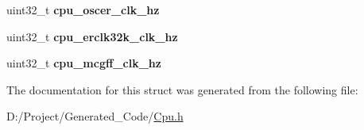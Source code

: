 \begin{DoxyCompactItemize}
\item 
\hypertarget{struct_t_cpu_clock_configuration_a8573f3896f85f97201ef2d6252d99905}{}uint32\+\_\+t {\bfseries cpu\+\_\+oscer\+\_\+clk\+\_\+hz}\label{struct_t_cpu_clock_configuration_a8573f3896f85f97201ef2d6252d99905}

\item 
\hypertarget{struct_t_cpu_clock_configuration_a3f68e3893f7dec551e938a909929687b}{}uint32\+\_\+t {\bfseries cpu\+\_\+erclk32k\+\_\+clk\+\_\+hz}\label{struct_t_cpu_clock_configuration_a3f68e3893f7dec551e938a909929687b}

\item 
\hypertarget{struct_t_cpu_clock_configuration_a5bd9b1235d0f85073ed01c126782d898}{}uint32\+\_\+t {\bfseries cpu\+\_\+mcgff\+\_\+clk\+\_\+hz}\label{struct_t_cpu_clock_configuration_a5bd9b1235d0f85073ed01c126782d898}

\end{DoxyCompactItemize}


The documentation for this struct was generated from the following file\+:\begin{DoxyCompactItemize}
\item 
D\+:/\+Project/\+Generated\+\_\+\+Code/\hyperlink{_cpu_8h}{Cpu.\+h}\end{DoxyCompactItemize}
